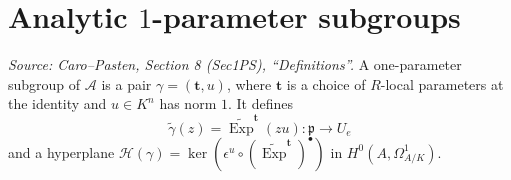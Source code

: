 \section{Analytic \texorpdfstring{\(1\)}{1}-parameter subgroups}

\begin{definition}
  \label{def:cp_one_parameter_subgroup}
  \textit{Source: Caro--Pasten, Section 8 (Sec1PS), ``Definitions''.}
  A one-parameter subgroup of \(\mathcal A\) is a pair
  \(\gamma=(\mathbf t,u)\), where \(\mathbf t\) is a choice of \(R\)-local
  parameters at the identity and \(u\in K^n\) has norm \(1\).  It defines
  \[
    \widetilde\gamma(z)=\widetilde{\operatorname{Exp}}^{\mathbf t}(zu)
      :\mathfrak p\to U_e
  \]
  and a hyperplane
  \(\mathcal H(\gamma)=\ker(\epsilon^u\circ
  (\widetilde{\operatorname{Exp}}^{\mathbf t})^\bullet)\) in
  \(H^0(A,\Omega^1_{A/K})\).
\end{definition}


